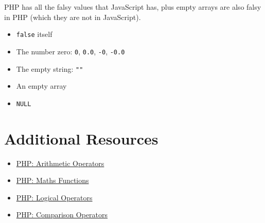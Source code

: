 PHP has all the falsy values that JavaScript has, plus empty arrays are also falsy in PHP (which they are not in JavaScript).

\begin{itemize}
    \item \texttt{false} itself
    \item The number zero: \texttt{0}, \texttt{0.0}, \texttt{-0}, \texttt{-0.0}
    \item The empty string: \texttt{""}
    \item An empty array
    \item \texttt{NULL}
\end{itemize}



\section{Additional Resources}

\begin{itemize}[leftmargin=*]
    \item \href{https://www.php.net/manual/en/language.operators.arithmetic.php}{PHP: Arithmetic Operators}
    \item \href{https://www.php.net/manual/en/ref.math.php}{PHP: Maths Functions}
    \item \href{http://php.net/manual/en/language.operators.logical.php}{PHP: Logical Operators}
    \item \href{http://php.net/manual/en/language.operators.comparison.php}{PHP: Comparison Operators}
\end{itemize}
